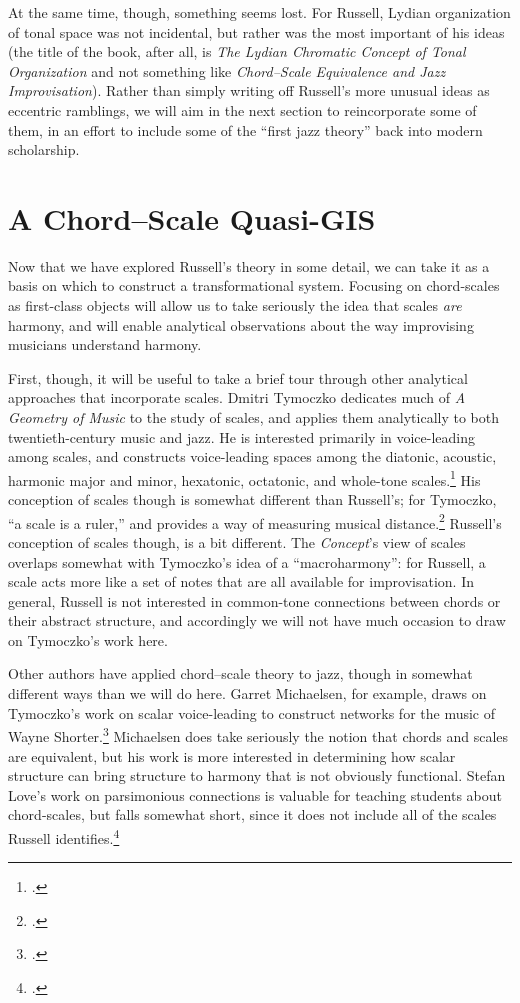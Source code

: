 At the same time, though, something seems lost. For Russell, Lydian
organization of tonal space was not incidental, but rather was the most
important of his ideas (the title of the book, after all, is \emph{The Lydian
Chromatic Concept of Tonal Organization} and not something like
\emph{Chord--Scale Equivalence and Jazz Improvisation}). Rather than simply
writing off Russell's more unusual ideas as eccentric ramblings, we will aim
in the next section to reincorporate some of them, in an effort to include some
of the ``first jazz theory'' back into modern scholarship.

\section{A Chord--Scale Quasi-GIS}
\label{sec:cst}

Now that we have explored Russell's theory in some detail, we can take it as a
basis on which to construct a transformational system. Focusing on
chord-scales as first-class objects will allow us to take seriously the idea
that scales \emph{are} harmony, and will enable analytical observations about
the way improvising musicians understand harmony.

First, though, it will be useful to take a brief tour through other analytical
approaches that incorporate scales. Dmitri Tymoczko dedicates much of \emph{A
Geometry of Music} to the study of scales, and applies them analytically to
both twentieth-century music and jazz. He is interested primarily in
voice-leading among scales, and constructs voice-leading spaces among the
diatonic, acoustic, harmonic major and minor, hexatonic, octatonic, and
whole-tone scales.\footcite[135]{tymoczko:2011} His conception of scales
though is somewhat different than Russell's; for Tymoczko, ``a scale is a
ruler,'' and provides a way of measuring musical
distance.\footcite[116]{tymoczko:2011} Russell's conception of scales though,
is a bit different. The \emph{Concept}'s view of scales overlaps somewhat with
Tymoczko's idea of a ``macroharmony'': for Russell, a scale acts more like a
set of notes that are all available for improvisation. In general, Russell is
not interested in common-tone connections between chords or their abstract
structure, and accordingly we will not have much occasion to draw on
Tymoczko's work here.

Other authors have applied chord--scale theory to jazz, though in somewhat
different ways than we will do here. Garret Michaelsen, for example, draws on
Tymoczko's work on scalar voice-leading to construct networks for the music of
Wayne Shorter.\footcite{michaelsen:2012} Michaelsen does take seriously the
notion that chords and scales are equivalent, but his work is more interested
in determining how scalar structure can bring structure to harmony that is not
obviously functional. Stefan Love's work on parsimonious connections is
valuable for teaching students about chord-scales, but falls somewhat short,
since it does not include all of the scales Russell
identifies.\footcite{love:2009}

